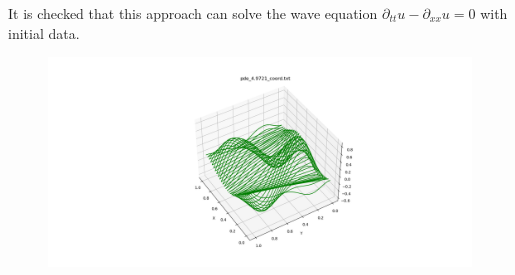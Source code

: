 \documentclass[12pt]{article}
\begin{document}
It is checked that this approach can solve the wave equation $\partial_{tt} u - \partial_{xx} u = 0$ with initial data.
%
\begin{figure}[H]
	\centering
	\includegraphics[width=1.0\linewidth]{../wave_equation/data/wave_equation_ex.png}
\end{figure}








\appendix









\end{document}
